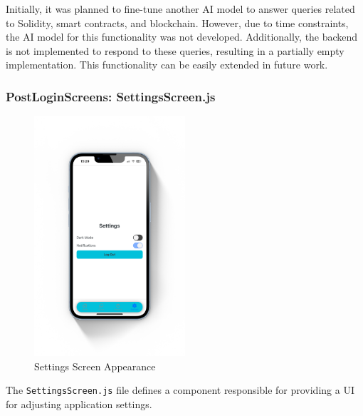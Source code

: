 Initially, it was planned to fine-tune another AI model to answer queries related to Solidity, smart contracts, and blockchain. However, due to time constraints, the AI model for this functionality was not developed. Additionally, the backend is not implemented to respond to these queries, resulting in a partially empty implementation. This functionality can be easily extended in future work.

\subsubsection{PostLoginScreens: SettingsScreen.js}

\begin{figure}[!ht]
    \centering
    \includegraphics[width=0.5\textwidth]{LATEX/Appendices/Images/Software/Frontend/settings_screen.png}
    \caption{Settings Screen Appearance}
    \label{fig:settings screen}
\end{figure}

The \texttt{SettingsScreen.js} file defines a component responsible for providing a UI for adjusting application settings.

